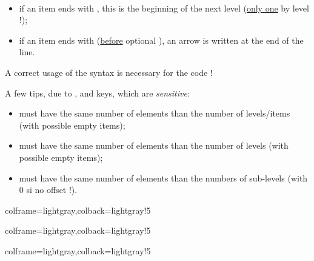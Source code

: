 \documentclass[11pt,a4paper]{ltxdoc}
\begin{document}
\smallskip

\hfill{}\hfill~

\begin{itemize}
	\item if an item ends with \MontreCode{(*)}, this is the beginning of the next level (\underline{only one} by level !);
	\item if an item ends with \MontreCode{(>)} (\underline{before} optional \MontreCode{(*)}), an arrow is written at the end of the line.
\end{itemize}

A correct usage of the syntax is necessary for the code !

\vspace{5mm}

A few tips, due to ,  and  keys, which are \textit{sensitive}:

\begin{itemize}
	\item {} must have the same number of elements than the number of levels/items (with possible empty items);
	\item {} must have the same number of elements than the number of levels (with possible empty items);
	\item {} must have the same number of elements than the numbers of sub-levels (with 0 si no offset !).
\end{itemize}

\begin{tcblisting}{colframe=lightgray,colback=lightgray!5}
\end{tcblisting}

\begin{tcblisting}{colframe=lightgray,colback=lightgray!5}
\end{tcblisting}

\begin{tcblisting}{colframe=lightgray,colback=lightgray!5}
\end{tcblisting}
\end{document}
